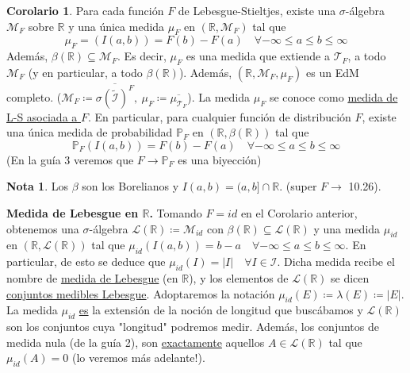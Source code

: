 \documentclass[11pt]{article}
\theoremstyle{definition} %
\newtheorem{corollary}[theorem]{Corolario}
\newtheorem{note}[theorem]{Nota}
\newcommand{\R}{\mathbb{R}}
\begin{document}
\begin{property}
\begin{corollary}
	Para cada función $F$ de Lebesgue-Stieltjes, existe una $\sigma$-álgebra $\mathscr{M}_F$ sobre $\R$ y una única medida $\mu_F$ en $(\R,\mathscr{M}_F)$ tal que
	\[ \mu_F = (I(a,b)) = F(b) - F(a) \quad \forall -\infty \leq a \leq b \leq \infty \]
	Además, $\beta(\R) \subseteq \mathscr{M}_F$. Es decir, $\mu_F$ es una medida que extiende a $\mathcal{T}_F$, a todo $\mathscr{M}_F$ (y en particular, a todo $\beta(\R)$). Además, $(\R, \mathscr{M}_F, \mu_F)$ es un EdM completo. ($\mathscr{M}_F \coloneq \overline{\sigma(\widetilde{\mathcal{I}})^F},\ \mu_F \coloneq \overline{\mu_{\mathcal{T}_F}}$). La medida $\mu_F$ se conoce como \underline{medida de L-S asociada a $F$}. En particular, para cualquier función de distribución $F$, existe una única medida de probabilidad $\mathbb{P}_F$ en $(\R,\beta(\R))$ tal que 
	\[ \mathbb{P}_F(I(a,b)) = F(b) - F(a) \quad \forall -\infty \leq a \leq b \leq \infty \]
	(En la guía 3 veremos que $F \to \mathbb{P}_F$ es una biyección)
\end{corollary}

\begin{note}
	Los $\beta$ son los Borelianos y $I(a,b) = (a,b] \cap \R$. (super $F \to$ 10.26).
\end{note}

\begin{eg}[Importante!]
	\textbf{Medida de Lebesgue en $\R$.} Tomando $F = id$ en el Corolario anterior, obtenemos una $\sigma$-álgebra $\mathscr{L}(\R) \coloneq \mathscr{M}_{id}$ con $\beta(\R) \subseteq \mathscr{L}(\R)$ y una medida $\mu_{id}$ en $(\R,\mathscr{L}(\R))$ tal que $\mu_{id}(I(a,b)) = b-a \quad \forall -\infty \leq a \leq b \leq \infty$. En particular, de esto se deduce que $\mu_{id}(I) = |I|\quad \forall I \in \mathcal{I}$. Dicha medida recibe el nombre de \underline{medida de Lebesgue} (en $\R$), y los elementos de $\mathscr{L}(\R)$ se dicen \underline{conjuntos medibles Lebesgue}. Adoptaremos la notación $\mu_{id}(E) \coloneq \lambda(E) \coloneq |E|$. La medida $\mu_{id}$ \underline{es} la extensión de la noción de longitud que buscábamos y $\mathscr{L}(\R)$ son los conjuntos cuya "longitud" podremos medir. Además, los conjuntos de medida nula (de la guía 2), son \underline{exactamente} aquellos $A \in \mathscr{L}(\R)$ tal que $\mu_{id}(A) = 0$ (lo veremos más adelante!).
\end{eg}


\end{property}
\end{document}
